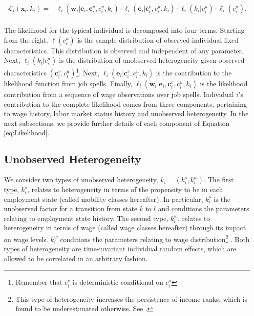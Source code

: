 \documentclass[12pt, a4paper]{article}
\begin{document}

\begin{align}\label{eq:Likelihood}
\mathcal{L}_{i}(\textbf{x}_i,k_i)= & \ell_{i}(\textbf{w}_i|\textbf{e}_i,\textbf{c}_i^v,c_i^u,k_i) \cdot \ell_{i}(\textbf{e}_i|\textbf{c}_i^v,c_i^u,k_i)\cdot \ell_{i}(k_i|c_i^u)\cdot \ell_{i}(c_i^u).\\ \nonumber
\end{align}



The likelihood for the typical individual is decomposed into four terms. Starting from the right, $\ell (c_i^u)$ is the sample distribution of observed individual fixed characteristics. This distribution is observed and independent of any parameter. Next, $\ell_{i}(k_i|c_i^u)$ is the distribution of unobserved heterogeneity given observed characteristics $(\textbf{c}_i^v,c_i^u)$\footnote{Remember that $c_i^v$ is deterministic conditional on $c_i^u$}. Next,  $\ell_{i}(\textbf{e}_i|\textbf{c}_{i}^{v},c_{i}^{u},k_{i})$ is the contribution to the likelihood function from job spells. Finally, $\ell_{i}(\textbf{w}_i|\textbf{e}_i,\textbf{c}_i^v,c_i^u,k_i)$ is the likelihood contribution from a sequence of wage observations over job spells. Individual $i$'s contribution to the complete likelihood comes from three components, pertaining to wage history, labor market status history and unobserved heterogeneity. In the next subsections, we provide further details of each component of Equation \ref{eq:Likelihood}.

\subsection{Unobserved Heterogeneity}\label{sec:unobs_het}

We consider two types of unobserved heterogeneity, $k_i=(k_i^{s},k_i^w)$. The first type, $k_i^{s}$, relates to heterogeneity in terms of the propensity to be in each employment state (called mobility classes hereafter). In particular, $k_i^{s}$ is the unobserved factor for a transition from state $k$ to $l$ and conditions the parameters relating to employment state history. The second type, $k_i^w$, relates to heterogeneity in terms of wage (called wage classes hereafter) through its impact on wage levels. $k_i^w$ conditions the parameters relating to wage distribution\footnote{This type of heterogeneity increases the persistence of income ranks, which is found to be underestimated otherwise. See \cite{Sh76}.} . Both types of heterogeneity are time-invariant individual random effects, which are allowed to be correlated in an arbitrary fashion.
\end{document}

